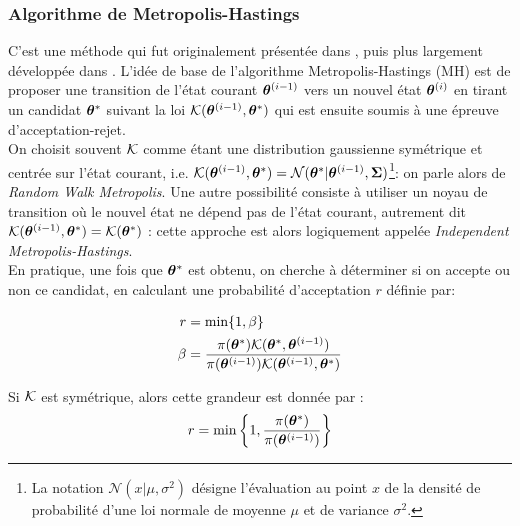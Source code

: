 \subsubsection{Algorithme de Metropolis-Hastings}

C'est une méthode qui {fut} originalement présentée dans \cite{Metropolis1953}, puis plus largement développée dans \cite{Hastings1970}. L'idée de base de l'algorithme Metropolis-Hastings (MH) est de proposer une transition de l'état courant ${{\bm{\theta}}^{(i-1)}}$ vers un nouvel état ${\bm{\theta}}^{(i)}$ en tirant un candidat ${{\bm{\theta}}^*}$ suivant la loi ${\mathcal{K}}({{\bm{\theta}}^{(i-1)}}, {{\bm{\theta}}^*})$ qui est ensuite soumis à une épreuve d'acceptation-rejet. \\

On choisit souvent ${\mathcal{K}}$ comme étant une distribution gaussienne symétrique et centrée sur l'état courant, i.e. ${\mathcal{K}}({{\bm{\theta}}^{(i-1)}}, {{\bm{\theta}}^*}) = \mathcal{N}({{\bm{\theta}}^*} | {{\bm{\theta}}^{(i-1)}}, {\bm{\Sigma}})$\footnote{La notation $\mathcal{N}(x|\mu,\sigma^2)$ désigne l'évaluation au point $x$ de la densité de probabilité d'une loi normale de moyenne $\mu$ et de variance $\sigma^2$.}: on parle alors de \textit{Random Walk Metropolis}. Une autre possibilité consiste à utiliser un noyau de transition où le nouvel état ne dépend pas de l'état courant, autrement dit ${\mathcal{K}}({{\bm{\theta}}^{(i-1)}}, {{\bm{\theta}}^*}) = {\mathcal{K}}({{\bm{\theta}}^*})$ : cette approche est alors logiquement appelée \textit{Independent Metropolis-Hastings}. \\

En pratique, une fois que ${{\bm{\theta}}^*}$ est obtenu, on cherche à déterminer si on accepte ou non ce candidat, en calculant une probabilité d'acceptation $r$ définie par:

\begin{equation}
{
\label{eq_acceptation_MH}
\begin{split}
r & =\min\{1,\beta\} \\
\beta & =\dfrac{\pi({{\bm{\theta}}^*}){\mathcal{K}}({{\bm{\theta}}^*}, {{\bm{\theta}}^{(i-1)}})}{\pi({{\bm{\theta}}^{(i-1)}}){\mathcal{K}}({{\bm{\theta}}^{(i-1)}}, {{\bm{\theta}}^*})}
\end{split}
}
\end{equation}

{
Si ${\mathcal{K}}$ est symétrique, alors cette grandeur est donnée par : 
}
\begin{equation}
{
	r = \min\left\{1,\dfrac{\pi({{\bm{\theta}}^*})}{\pi({{\bm{\theta}}^{(i-1)}})}\right\}
	\label{eq_acceptation_metropolis}
}
\end{equation}

